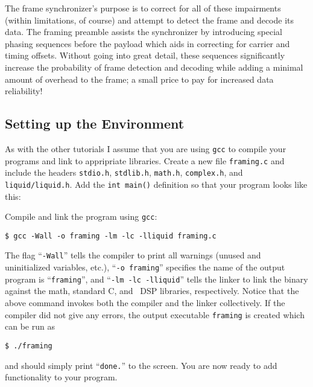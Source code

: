 The frame synchronizer's purpose is to correct for all of these
impairments (within limitations, of course) and attempt to detect the
frame and decode its data.
The framing preamble assists the synchronizer by introducing special
phasing sequences before the payload which aids in correcting for
carrier and timing offsets.
Without going into great detail, these sequences significantly increase
the probability of frame detection and decoding while adding a minimal
amount of overhead to the frame;
a small price to pay for increased data reliability!


%
%
\subsection{Setting up the Environment}
\label{tutorial:framing:environment}

As with the other tutorials I assume that you are using {\tt gcc} to
compile your programs and link to appripriate libraries.
Create a new file {\tt framing.c} and include the headers
{\tt stdio.h},
{\tt stdlib.h},
{\tt math.h},
{\tt complex.h}, and
{\tt liquid/liquid.h}.
Add the {\tt int main()} definition so that your program looks like
this:
%

%
Compile and link the program using {\tt gcc}:
%
\begin{Verbatim}[fontsize=\small]
    $ gcc -Wall -o framing -lm -lc -lliquid framing.c
\end{Verbatim}
%
The flag ``{\tt -Wall}'' tells the compiler to print all warnings
(unused and uninitialized variables, etc.),
``{\tt -o framing}'' specifies the name of the output program is
``{\tt framing}'', and
``{\tt -lm -lc -lliquid}'' tells the linker to link the binary against
the math, standard C, and \liquid\ DSP libraries, respectively.
Notice that the above command invokes both the compiler and the linker
collectively.
%
If the compiler did not give any errors, the output executable
{\tt framing} is created which can be run as
%
\begin{Verbatim}[fontsize=\small]
    $ ./framing
\end{Verbatim}
%
and should simply print ``{\tt done.}'' to the screen.
You are now ready to add functionality to your program.



%
%

